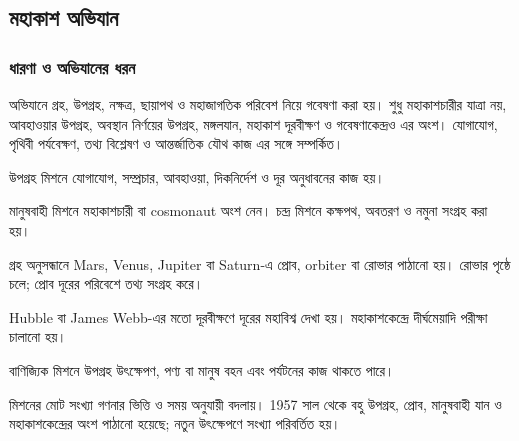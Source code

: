 \subsection{মহাকাশ অভিযান}
\label{sec:ch1-space}
\subsubsection{ধারণা ও অভিযানের ধরন}
অভিযানে গ্রহ, উপগ্রহ, নক্ষত্র, ছায়াপথ ও মহাজাগতিক পরিবেশ নিয়ে গবেষণা করা হয়। শুধু মহাকাশচারীর যাত্রা নয়, আবহাওয়ার উপগ্রহ, অবস্থান নির্ণয়ের উপগ্রহ, মঙ্গলযান, মহাকাশ দূরবীক্ষণ ও গবেষণাকেন্দ্রও এর অংশ। যোগাযোগ, পৃথিবী পর্যবেক্ষণ, তথ্য বিশ্লেষণ ও আন্তর্জাতিক যৌথ কাজ এর সঙ্গে সম্পর্কিত।
\begin{compactpoints}
\item উপগ্রহ মিশনে যোগাযোগ, সম্প্রচার, আবহাওয়া, দিকনির্দেশ ও দূর অনুধাবনের কাজ হয়।
\item মানুষবাহী মিশনে মহাকাশচারী বা cosmonaut অংশ নেন। চন্দ্র মিশনে কক্ষপথ, অবতরণ ও নমুনা সংগ্রহ করা হয়।
\item গ্রহ অনুসন্ধানে Mars, Venus, Jupiter বা Saturn-এ প্রোব, orbiter বা রোভার পাঠানো হয়। রোভার পৃষ্ঠে চলে; প্রোব দূরের পরিবেশে তথ্য সংগ্রহ করে।
\item Hubble বা James Webb-এর মতো দূরবীক্ষণে দূরের মহাবিশ্ব দেখা হয়। মহাকাশকেন্দ্রে দীর্ঘমেয়াদি পরীক্ষা চালানো হয়।
\item বাণিজ্যিক মিশনে উপগ্রহ উৎক্ষেপণ, পণ্য বা মানুষ বহন এবং পর্যটনের কাজ থাকতে পারে।
\end{compactpoints}
মিশনের মোট সংখ্যা গণনার ভিত্তি ও সময় অনুযায়ী বদলায়। 1957 সাল থেকে বহু উপগ্রহ, প্রোব, মানুষবাহী যান ও মহাকাশকেন্দ্রের অংশ পাঠানো হয়েছে; নতুন উৎক্ষেপণে সংখ্যা পরিবর্তিত হয়।
